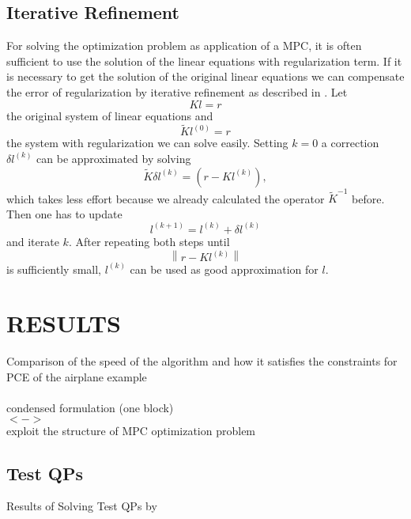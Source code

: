 \documentclass[letterpaper, 10 pt, conference]{ieeeconf}  %
\begin{document}
\subsection{Iterative Refinement}

For solving the optimization problem as application of a MPC, it is often sufficient to use the solution of the linear equations with regularization term. If it is necessary to get the solution of the original linear equations we can compensate the error of regularization by iterative refinement as described in \cite{c6}. Let
\begin{equation*}
  K l = r
\end{equation*}
the original system of linear equations and
\begin{equation*}
  \tilde{K}l^{(0)} = r
\end{equation*}
the system with regularization we can solve easily. Setting $k=0$ a correction $\delta l^{(k)}$ can be approximated by solving
\begin{equation*}
  \tilde{K}\delta l^{(k)} = \left(r-Kl^{(k)} \right),
\end{equation*}
which takes less effort because we already calculated the operator $\tilde{K}^{-1}$ before. Then one has to update
\begin{equation*}
  l^{(k+1)} = l^{(k)}+\delta l^{(k)}
\end{equation*}
and iterate $k$. After repeating both steps until
\begin{equation*}
  \left\|r-Kl^{(k)} \right\|
\end{equation*}
is sufficiently small, $l^{(k)}$ can be used as good approximation for $l$.

\section{RESULTS}
Comparison of the speed of the algorithm and how it satisfies the constraints for PCE of the airplane example\\
\\
condensed formulation (one block) \\$<->$ \\exploit the structure of MPC optimization problem

\subsection{Test QPs}

Results of Solving Test QPs by \cite{c3}
\end{document}
